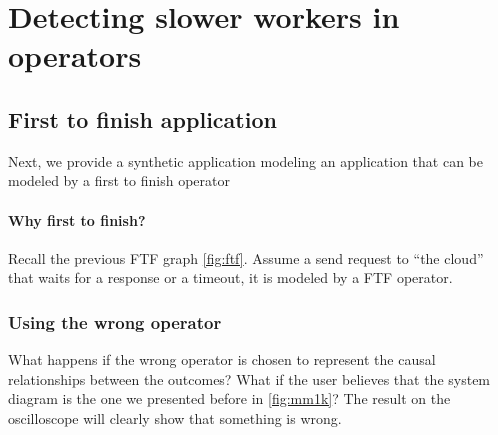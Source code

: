 \section{Detecting slower workers in operators}
    \subsection{First to finish application}
        Next, we provide a synthetic application modeling an application that can be modeled by a first to finish operator

        \paragraph{Why first to finish?} Recall the previous FTF graph \cref{fig:ftf}. Assume a send request to ``the cloud'' that waits for a response or a timeout, it is modeled by a FTF operator. \cite{dq-tut}
       \subsubsection{Using the wrong operator}
            What happens if the wrong operator is chosen to represent the causal relationships between the outcomes? What if the user believes that the system diagram is the one we presented before in \cref{fig:mm1k}? The result on the oscilloscope will clearly show that something is wrong.


